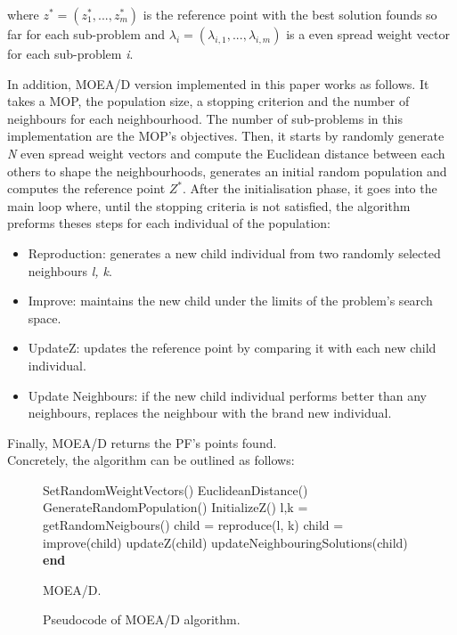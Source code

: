 where $z^{*} = (z^{*}_{1}, ..., z^{*}_{m})$ is the reference point with the best solution founds so far for each sub-problem and $\lambda_{i} = (\lambda_{i,1}, ..., \lambda_{i,m})$ is a even spread weight vector for each sub-problem \textit{i}.

In addition, MOEA/D version implemented in this paper works as follows. It takes a MOP, the population size, a stopping criterion and the number of neighbours for each neighbourhood. The number of sub-problems in this implementation are the MOP's objectives. Then, it starts by randomly generate \textit{N} even spread weight vectors and compute the Euclidean distance between each others to shape the neighbourhoods, generates an initial random population and computes the reference point $Z^{*}$. After the initialisation phase, it goes into the main loop where, until the stopping criteria is not satisfied, the algorithm preforms theses steps for each individual of the population:
\begin{itemize}
  \item Reproduction: generates a new child individual from two randomly selected neighbours \textit{l, k}.
  \item Improve: maintains the new child under the limits of the problem's search space.
  \item UpdateZ: updates the reference point by comparing it with each new child individual.
  \item Update Neighbours: if the new child individual performs better than any neighbours, replaces the neighbour with the brand new individual.
\end{itemize}
Finally, MOEA/D returns the PF's points found. \\

Concretely, the algorithm can be outlined as follows: \\
\begin{figure}
    \centering
\begin{algorithm}[H]
\begin{algorithmic}[1]
  \State SetRandomWeightVectors()\;
  \State EuclideanDistance()\;
  \State GenerateRandomPopulation()\;
  \State InitializeZ()\;
      \State l,k = getRandomNeigbours()\;
      \State child = reproduce(l, k)\;
      \State child = improve(child)\;
      \State updateZ(child)\;
      \State updateNeighbouringSolutions(child)\;
    \EndFor 
    \EndWhile
    \State \textbf{end}
\end{algorithmic}
\caption{MOEA/D.}
\end{algorithm}
\caption{Pseudocode of MOEA/D algorithm.}
\end{figure}


